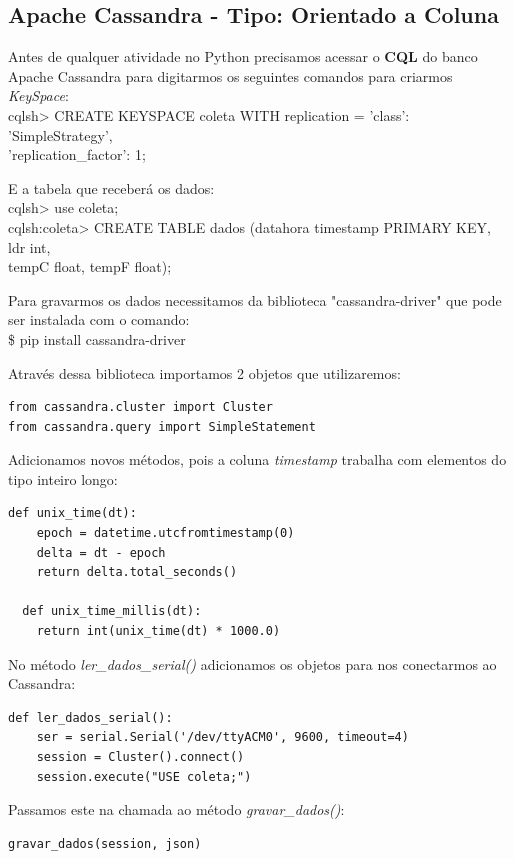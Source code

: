 \documentclass[a4paper,11pt]{article}
\begin{document}
\subsection*{Apache Cassandra - Tipo: Orientado a Coluna}
Antes de qualquer atividade no Python precisamos acessar o \textbf{CQL} do banco Apache Cassandra para digitarmos os seguintes comandos para criarmos \textit{KeySpace}: \\
{\ttfamily cqlsh> CREATE KEYSPACE coleta WITH replication = {'class': 'SimpleStrategy', \\ 'replication\_factor': 1};} 

E a tabela que receberá os dados: \\
{\ttfamily cqlsh> use coleta;} \\
{\ttfamily cqlsh:coleta> CREATE TABLE dados (datahora timestamp PRIMARY KEY, ldr int, \\ tempC float, tempF float);}

Para gravarmos os dados necessitamos da biblioteca "cassandra-driver" que pode ser instalada com o comando: \\
{\ttfamily\$ pip install cassandra-driver}

Através dessa biblioteca importamos 2 objetos que utilizaremos:
\begin{lstlisting}[]
from cassandra.cluster import Cluster
from cassandra.query import SimpleStatement
\end{lstlisting}

Adicionamos novos métodos, pois a coluna \textit{timestamp} trabalha com elementos do tipo inteiro longo:
\begin{lstlisting}[]
  def unix_time(dt):
    epoch = datetime.utcfromtimestamp(0)
    delta = dt - epoch
    return delta.total_seconds()
	
  def unix_time_millis(dt):
    return int(unix_time(dt) * 1000.0)
\end{lstlisting}

No método \textit{ler\_dados\_serial()} adicionamos os objetos para nos conectarmos ao Cassandra:
\begin{lstlisting}[]
  def ler_dados_serial():
	ser = serial.Serial('/dev/ttyACM0', 9600, timeout=4)
	session = Cluster().connect()
	session.execute("USE coleta;")
\end{lstlisting}

Passamos este na chamada ao método \textit{gravar\_dados()}:
\begin{lstlisting}[]
	gravar_dados(session, json)
\end{lstlisting}
\end{document}
